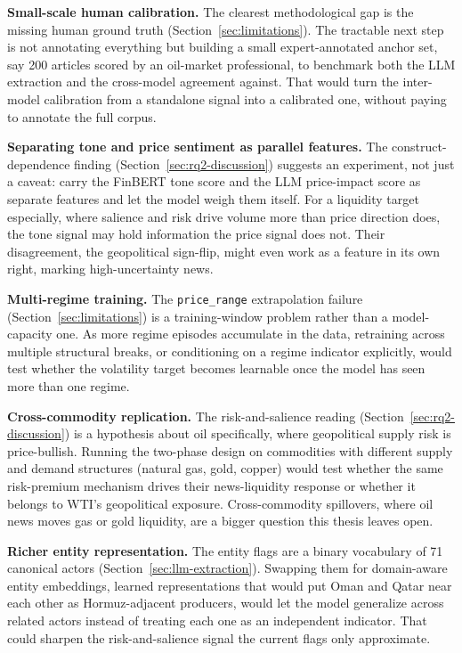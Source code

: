 \textbf{Small-scale human calibration.} The clearest methodological gap is the missing human ground truth (Section~\ref{sec:limitations}). The tractable next step is not annotating everything but building a small expert-annotated anchor set, say 200 articles scored by an oil-market professional, to benchmark both the LLM extraction and the cross-model agreement against. That would turn the inter-model calibration from a standalone signal into a calibrated one, without paying to annotate the full corpus.

\textbf{Separating tone and price sentiment as parallel features.} The construct-dependence finding (Section~\ref{sec:rq2-discussion}) suggests an experiment, not just a caveat: carry the FinBERT tone score and the LLM price-impact score as separate features and let the model weigh them itself. For a liquidity target especially, where salience and risk drive volume more than price direction does, the tone signal may hold information the price signal does not. Their disagreement, the geopolitical sign-flip, might even work as a feature in its own right, marking high-uncertainty news.

\textbf{Multi-regime training.} The \texttt{price\_range} extrapolation failure (Section~\ref{sec:limitations}) is a training-window problem rather than a model-capacity one. As more regime episodes accumulate in the data, retraining across multiple structural breaks, or conditioning on a regime indicator explicitly, would test whether the volatility target becomes learnable once the model has seen more than one regime.

\textbf{Cross-commodity replication.} The risk-and-salience reading (Section~\ref{sec:rq2-discussion}) is a hypothesis about oil specifically, where geopolitical supply risk is price-bullish. Running the two-phase design on commodities with different supply and demand structures (natural gas, gold, copper) would test whether the same risk-premium mechanism drives their news-liquidity response or whether it belongs to WTI's geopolitical exposure. Cross-commodity spillovers, where oil news moves gas or gold liquidity, are a bigger question this thesis leaves open.

\textbf{Richer entity representation.} The entity flags are a binary vocabulary of 71 canonical actors (Section~\ref{sec:llm-extraction}). Swapping them for domain-aware entity embeddings, learned representations that would put Oman and Qatar near each other as Hormuz-adjacent producers, would let the model generalize across related actors instead of treating each one as an independent indicator. That could sharpen the risk-and-salience signal the current flags only approximate.
